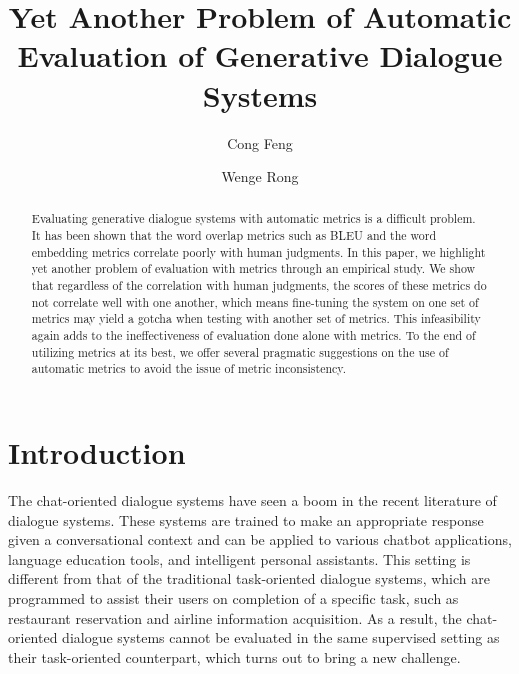 \documentclass[runningheads]{llncs}
\begin{document}
    \title{Yet Another Problem of Automatic Evaluation of Generative Dialogue Systems}
    \author{Cong Feng \and Wenge Rong}

    \maketitle

    \begin{abstract}
        Evaluating generative dialogue systems with automatic metrics is a difficult problem. It has been shown that the word overlap metrics such as BLEU and the word embedding metrics correlate poorly with human judgments. In this paper, we highlight yet another problem of evaluation with metrics through an empirical study. We show that regardless of the correlation with human judgments, the scores of these metrics do not correlate well with one another, which means fine-tuning the system on one set of metrics may yield a gotcha when testing with another set of metrics. This infeasibility again adds to the ineffectiveness of evaluation done alone with metrics. To the end of utilizing metrics at its best, we offer several pragmatic suggestions on the use of automatic metrics to avoid the issue of metric inconsistency.
    \end{abstract}

    \section{Introduction}
    The chat-oriented dialogue systems have seen a boom in the recent literature of dialogue systems. These systems are trained to make an appropriate response given a conversational context and can be applied to various chatbot applications, language education tools, and intelligent personal assistants. This setting is different from that of the traditional task-oriented dialogue systems, which are programmed to assist their users on completion of a specific task, such as restaurant reservation and airline information acquisition. As a result, the chat-oriented dialogue systems cannot be evaluated in the same supervised setting as their task-oriented counterpart, which turns out to bring a new challenge.
\end{document}

